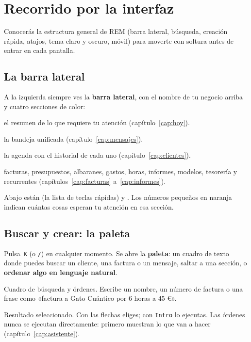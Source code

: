 \chapter{Recorrido por la interfaz}\label{cap:recorrido}

\begin{objbox}
Conocerás la estructura general de REM (barra lateral, búsqueda, creación rápida, atajos, tema claro y oscuro, móvil) para moverte con soltura antes de entrar en cada pantalla.
\end{objbox}

\section{La barra lateral}
A la izquierda siempre ves la \textbf{barra lateral}, con el nombre de tu negocio arriba y cuatro secciones de color:
\begin{description}[leftmargin=0.6cm,style=nextline]
\item[Hoy] el resumen de lo que requiere tu atención (capítulo~\ref{cap:hoy}).
\item[Mensajes] la bandeja unificada (capítulo~\ref{cap:mensajes}).
\item[Clientes] la agenda con el historial de cada uno (capítulo~\ref{cap:clientes}).
\item[Dinero] facturas, presupuestos, albaranes, gastos, horas, informes, modelos, tesorería y recurrentes (capítulos~\ref{cap:facturas} a~\ref{cap:informes}).
\end{description}
Abajo están  (la lista de teclas rápidas) y . Los números pequeños en naranja indican cuántas cosas esperan tu atención en esa sección.

\section{Buscar y crear: la paleta}
Pulsa \cmd\,\texttt{K} (o \texttt{/}) en cualquier momento. Se abre la \textbf{paleta}: un cuadro de texto donde puedes buscar un cliente, una factura o un mensaje, saltar a una sección, o \textbf{ordenar algo en lenguaje natural}.

\begin{leyenda}
\item[\mk{1}] Cuadro de búsqueda y órdenes. Escribe un nombre, un número de factura o una frase como «factura a Gato Cuántico por 6 horas a 45 €».
\item[\mk{2}] Resultado seleccionado. Con las flechas eliges; con \texttt{Intro} lo ejecutas. Las órdenes nunca se ejecutan directamente: primero muestran lo que van a hacer (capítulo~\ref{cap:asistente}).
\end{leyenda}


